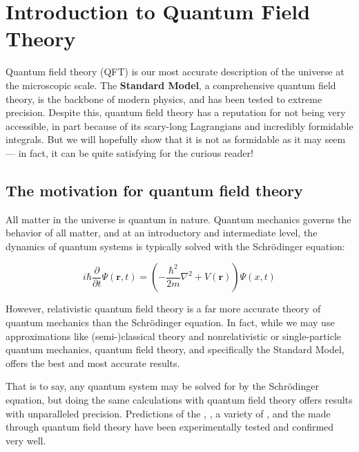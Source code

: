 \chapter{Introduction to Quantum Field Theory}

Quantum field theory (QFT)  is our most accurate description of the universe at the microscopic scale. The \textbf{Standard Model}, a comprehensive quantum field theory, is the backbone of modern physics, and has been tested to extreme precision. Despite this, quantum field theory has a reputation for not being very accessible, in part because of its scary-long Lagrangians and incredibly formidable integrals. But we will hopefully show that it is not as formidable as it may seem --- in fact, it can be quite satisfying for the curious reader!

\section{The motivation for quantum field theory}

All matter in the universe is quantum in nature. Quantum mechanics governs the behavior of all matter, and at an introductory and intermediate level, the dynamics of quantum systems is typically solved with the Schrödinger equation:

\begin{equation}
i\hbar \dfrac{\partial}{\partial t} \Psi(\mathbf{r}, t) = \left(-\dfrac{\hbar^2}{2m} \nabla^2 + V(\mathbf{r})\right) \Psi(x, t)
\end{equation}

However, relativistic quantum field theory is a far more accurate theory of quantum mechanics than the Schrödinger equation. In fact, while we may use approximations like (semi-)classical theory and nonrelativistic or single-particle quantum mechanics, quantum field theory, and specifically the Standard Model, offers the best and most accurate results. 

That is to say, any quantum system may be solved for by the Schrödinger equation, but doing the same calculations with quantum field theory offers results with unparalleled precision. Predictions of the , , a variety of , and the  made through quantum field theory have been experimentally tested and confirmed very well.

